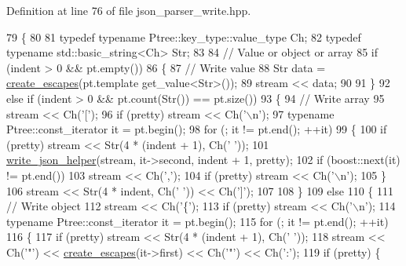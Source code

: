 Definition at line 76 of file json\+\_\+parser\+\_\+write.\+hpp.


\begin{DoxyCode}
79 \{
80 
81   \textcolor{keyword}{typedef} \textcolor{keyword}{typename} Ptree::key\_type::value\_type Ch;
82   \textcolor{keyword}{typedef} \textcolor{keyword}{typename} std::basic\_string<Ch> Str;
83 
84   \textcolor{comment}{// Value or object or array}
85   \textcolor{keywordflow}{if} (indent > 0 && pt.empty())
86   \{
87     \textcolor{comment}{// Write value}
88     Str data = \hyperlink{namespaceboost_1_1property__tree_1_1json__parser_a747e92e137769eb6b27edb76d613f37a}{create\_escapes}(pt.template get\_value<Str>());
89     stream << data;
90 
91   \}
92   \textcolor{keywordflow}{else} \textcolor{keywordflow}{if} (indent > 0 && pt.count(Str()) == pt.size())
93   \{
94     \textcolor{comment}{// Write array}
95     stream << Ch(\textcolor{charliteral}{'['});
96     \textcolor{keywordflow}{if} (pretty) stream << Ch(\textcolor{charliteral}{'\(\backslash\)n'});
97     \textcolor{keyword}{typename} Ptree::const\_iterator it = pt.begin();
98     \textcolor{keywordflow}{for} (; it != pt.end(); ++it)
99     \{
100       \textcolor{keywordflow}{if} (pretty) stream << Str(4 * (indent + 1), Ch(\textcolor{charliteral}{' '}));
101       \hyperlink{namespaceboost_1_1property__tree_1_1json__parser_a133973ddea67e6d77424312cd297b332}{write\_json\_helper}(stream, it->second, indent + 1, pretty);
102       \textcolor{keywordflow}{if} (boost::next(it) != pt.end())
103         stream << Ch(\textcolor{charliteral}{','});
104       \textcolor{keywordflow}{if} (pretty) stream << Ch(\textcolor{charliteral}{'\(\backslash\)n'});
105     \}
106     stream << Str(4 * indent, Ch(\textcolor{charliteral}{' '})) << Ch(\textcolor{charliteral}{']'});
107 
108   \}
109   \textcolor{keywordflow}{else}
110   \{
111     \textcolor{comment}{// Write object}
112     stream << Ch(\textcolor{charliteral}{'\{'});
113     \textcolor{keywordflow}{if} (pretty) stream << Ch(\textcolor{charliteral}{'\(\backslash\)n'});
114     \textcolor{keyword}{typename} Ptree::const\_iterator it = pt.begin();
115     \textcolor{keywordflow}{for} (; it != pt.end(); ++it)
116     \{
117       \textcolor{keywordflow}{if} (pretty) stream << Str(4 * (indent + 1), Ch(\textcolor{charliteral}{' '}));
118       stream << Ch(\textcolor{charliteral}{'"'}) << \hyperlink{namespaceboost_1_1property__tree_1_1json__parser_a747e92e137769eb6b27edb76d613f37a}{create\_escapes}(it->first) << Ch(\textcolor{charliteral}{'"'}) << Ch(\textcolor{charliteral}{':'});
119       \textcolor{keywordflow}{if} (pretty) \{

\end{DoxyCode}
